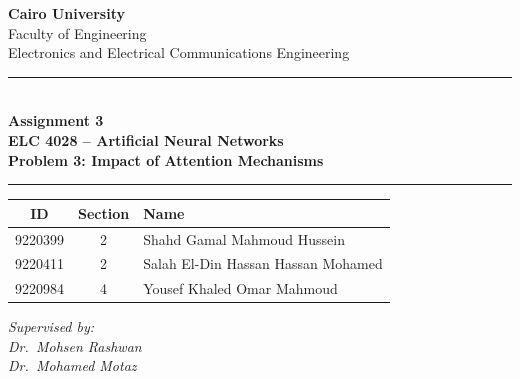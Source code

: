 \documentclass[12pt,a4paper]{article}
\begin{document}
\begin{titlepage}
\centering
\vspace*{0.5cm}

{\Large\bfseries Cairo University\\}
\vspace{0.2cm}
{\large Faculty of Engineering\\}
\vspace{0.2cm}
{\normalsize Electronics and Electrical Communications Engineering\\}

\vspace{1.2cm}
\rule{0.8\textwidth}{1.5pt}\\[0.4cm]
{\LARGE\bfseries Assignment 3}\\[0.3cm]
{\large\bfseries ELC 4028 -- Artificial Neural Networks}\\[0.2cm]
{\large\bfseries Problem 3: Impact of Attention Mechanisms}\\[0.2cm]
\rule{0.8\textwidth}{1.5pt}

\vspace{1.2cm}

\begin{tabular}{|c|c|l|}
\hline
\textbf{ID} & \textbf{Section} & \textbf{Name} \\
\hline
9220399 & 2 & Shahd Gamal Mahmoud Hussein \\
\hline
9220411 & 2 & Salah El-Din Hassan Hassan Mohamed \\
\hline
9220984 & 4 & Yousef Khaled Omar Mahmoud \\
\hline
\end{tabular}

\vspace{1.2cm}

\textit{Supervised by:}\\[0.3cm]
\textit{Dr.\ Mohsen Rashwan}\\
\textit{Dr.\ Mohamed Motaz}

\vfill
\end{titlepage}

\setcounter{tocdepth}{3}
\tableofcontents
\newpage
\listoffigures
\newpage
\listoftables
\newpage

\end{document}
